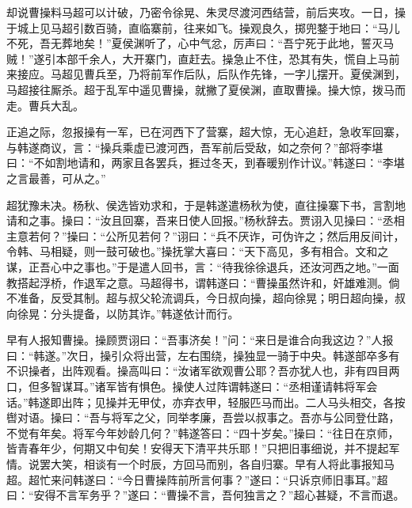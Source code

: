 却说曹操料马超可以计破，乃密令徐晃、朱灵尽渡河西结营，前后夹攻。一日，操于城上见马超引数百骑，直临寨前，往来如飞。操观良久，掷兜鍪于地曰：“马儿不死，吾无葬地矣！”夏侯渊听了，心中气忿，厉声曰：“吾宁死于此地，誓灭马贼！”遂引本部千余人，大开寨门，直赶去。操急止不住，恐其有失，慌自上马前来接应。马超见曹兵至，乃将前军作后队，后队作先锋，一字儿摆开。夏侯渊到，马超接往厮杀。超于乱军中遥见曹操，就撇了夏侯渊，直取曹操。操大惊，拨马而走。曹兵大乱。

正追之际，忽报操有一军，已在河西下了营寨，超大惊，无心追赶，急收军回寨，与韩遂商议，言：“操兵乘虚已渡河西，吾军前后受敌，如之奈何？”部将李堪曰：“不如割地请和，两家且各罢兵，捱过冬天，到春暖别作计议。”韩遂曰：“李堪之言最善，可从之。”

超犹豫未决。杨秋、侯选皆劝求和，于是韩遂遣杨秋为使，直往操寨下书，言割地请和之事。操曰：“汝且回寨，吾来日使人回报。”杨秋辞去。贾诩入见操曰：“丞相主意若何？”操曰：“公所见若何？”诩曰：“兵不厌诈，可伪许之；然后用反间计，令韩、马相疑，则一鼓可破也。”操抚掌大喜曰：“天下高见，多有相合。文和之谋，正吾心中之事也。”于是遣人回书，言：“待我徐徐退兵，还汝河西之地。”一面教搭起浮桥，作退军之意。马超得书，谓韩遂曰：“曹操虽然许和，奸雄难测。倘不准备，反受其制。超与叔父轮流调兵，今日叔向操，超向徐晃；明日超向操，叔向徐晃：分头提备，以防其诈。”韩遂依计而行。

早有人报知曹操。操顾贾诩曰：“吾事济矣！”问：“来日是谁合向我这边？”人报曰：“韩遂。”次日，操引众将出营，左右围绕，操独显一骑于中央。韩遂部卒多有不识操者，出阵观看。操高叫曰：“汝诸军欲观曹公耶？吾亦犹人也，非有四目两口，但多智谋耳。”诸军皆有惧色。操使人过阵谓韩遂曰：“丞相谨请韩将军会话。”韩遂即出阵；见操并无甲仗，亦弃衣甲，轻服匹马而出。二人马头相交，各按辔对语。操曰：“吾与将军之父，同举孝廉，吾尝以叔事之。吾亦与公同登仕路，不觉有年矣。将军今年妙龄几何？”韩遂答曰：“四十岁矣。”操曰：“往日在京师，皆青春年少，何期又中旬矣！安得天下清平共乐耶！”只把旧事细说，并不提起军情。说罢大笑，相谈有一个时辰，方回马而别，各自归寨。早有人将此事报知马超。超忙来问韩遂曰：“今日曹操阵前所言何事？”遂曰：“只诉京师旧事耳。”超曰：“安得不言军务乎？”遂曰：“曹操不言，吾何独言之？”超心甚疑，不言而退。

